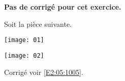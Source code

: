 \normaltrue \difficilefalse \tdifficilefalse
\correctionfalse


\setcounter{numques}{0}

\ifcorrection
\else
\textbf{Pas de corrigé pour cet exercice.}
\fi

\ifprof 
\else
Soit la pièce suivante.
\begin{center}
\texttt{[image: 01]}
\end{center}
 \fi
 
\ifprof
\else 
\begin{center}
\texttt{[image: 02]}
\end{center}
\fi

\ifprof
\else
\begin{flushright}
\footnotesize{Corrigé  voir \ref{E2:05:1005}.}
\end{flushright}%
\fi